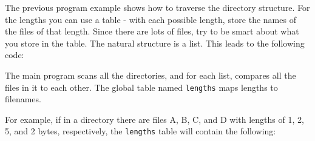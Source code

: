 The previous program example shows how to traverse the directory
structure. For the lengths you can use a table - with each possible
length, store the names of the files of that length. Since there are
lots of files, try to be smart about what you store in the table. The
natural structure is a list. This leads to the following code: 


The main program scans all the directories, and for each list, compares
all the files in it to each other. The global table named
\texttt{lengths} maps lengths to filenames.


For example, if in a directory there are files A, B, C, and D with
lengths of 1, 2, 5, and 2 bytes, respectively, the \texttt{lengths}
table will contain the following: 

